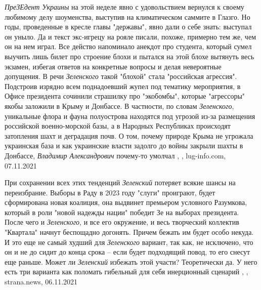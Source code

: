  
 
 
 
 

\emph{ПреЗЕдент Украины} на этой неделе явно с удовольствием вернулся к своему
любимому делу шоуменства, выступив на климатическом саммите в Глазго. Но годы,
проведенные в кресле главы "державы", явно дали о себе знать: выступал он
уныло.  Да и текст экс-игрецу на рояле писали, похоже, примерно тем же, чем он
на нем играл. Все действо напоминало анекдот про студента, который сумел
выучить лишь билет про строение блохи и пытался на этой блохе вытянуть весь
экзамен, избегая ответов на конкретные вопросы и делая невероятные допущения.
В речи \emph{Зеленского} такой "блохой" стала "российская агрессия". Подстроив
изрядно всем поднадоевший жупел под тематику мероприятия, в Офисе президента
сочинили страшилку про "экобомбы", которые "агрессоры" якобы заложили в Крыму и
Донбассе. В частности, по словам \emph{Зеленского}, уникальные флора и фауна
полуострова находятся под угрозой из-за размещения российской военно-морской
базы, а в Народных Республиках происходят затопления шахт и деградация почв. О
том, почему природе Крыма не угрожала украинская база и как украинские власти
задолго до войны закрыли шахты в Донбассе, \emph{Владимир Александрович} почему-то
умолчал
, 
, lug-info.com, 07.11.2021

При сохранении всех этих тенденций \emph{Зеленский} потеряет всякие шансы на
переизбрание. Выборы в Раду в 2023 году "слуги" проиграют, будет сформирована
новая коалиция, она выдвинет премьером условного Разумкова, который в роли
"новой надежды нации" победит Зе на выборах президента. После чего и
\emph{Зеленского}, и все его окружение, и весь творческий коллектив "Квартала" начнут
беспощадно догонять. Причем бежать им будет особо некуда. И это еще не самый
худший для \emph{Зеленского} вариант, так как, не исключено, что он и не до сидит до
конца срока – если будет подходящий повод, то его снесут еще раньше.  Может ли
\emph{Зеленский} избежать этой участи? Теоретически да.  У него есть три варианта как
поломать гибельный для себя инерционный сценарий
, 
, strana.news, 06.11.2021

